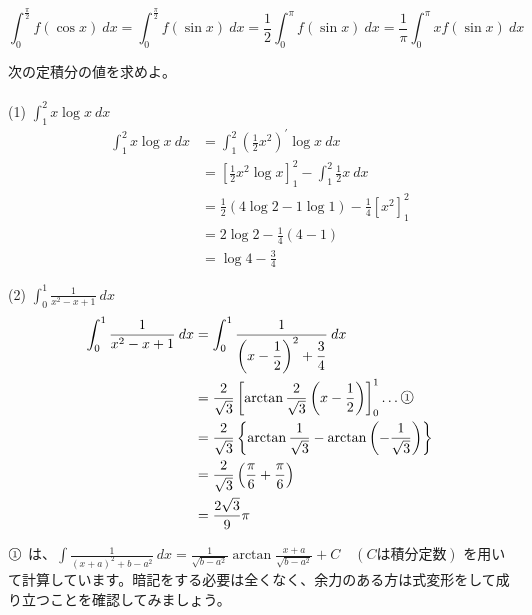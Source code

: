\documentclass[a4j]{jsarticle}
\newcommand{\ctext}[1]{\raise0.2ex\hbox{\textcircled{\scriptsize{#1}}}} %
\begin{document}
    \begin{equation*}
        \int_{0}^{\frac{\pi}{2}} f(\cos x) \: dx = \int_{0}^{\frac{\pi}{2}} f(\sin x) \: dx = \frac{1}{2} \int_{0}^{\pi}f(\sin x) \: dx = \frac{1}{\pi} \int_{0}^{\pi}xf(\sin x) \: dx
    \end{equation*}

    次の定積分の値を求めよ。\\ \\

    (1) $\displaystyle \int_{1}^{2} x \log x  \: dx$ \\

    \begin{align*}
        \int_{1}^{2} x \log x  \: dx &= \int_{1}^{2} \left(\frac{1}{2}x^2\right)^{\prime} \log x  \: dx \\
        &= \left[\frac{1}{2}x^2 \log x\right]_{1}^{2} - \int_{1}^{2} \frac{1}{2} x \: dx \\
        &= \frac{1}{2} (4 \log 2 - 1 \log 1) - \frac{1}{4} \left[x^2\right]_{1}^{2} \\
        &= 2 \log 2 - \frac{1}{4} (4 - 1) \\
        &= \log 4 - \frac{3}{4}
    \end{align*}

    (2) $\displaystyle \int_{0}^{1} \frac{1}{x^2 - x + 1}  \: dx$ \\

    \begin{align*}
        \int_{0}^{1} \frac{1}{x^2 - x + 1}  \: dx &= \int_{0}^{1} \frac{1}{\left(x - \dfrac{1}{2}\right)^2 + \dfrac{3}{4}}  \: dx \\
        &= \frac{2}{\sqrt{3}} \left[\arctan \frac{2}{\sqrt{3}}\left(x - \frac{1}{2}\right)\right]_{0}^{1} \dots \ctext{1} \\
        &= \frac{2}{\sqrt{3}} \left\{\arctan \frac{1}{\sqrt{3}} - \arctan\left(-\frac{1}{\sqrt{3}}\right)\right\} \\
        &= \frac{2}{\sqrt{3}} \left(\frac{\pi}{6} + \frac{\pi}{6}\right) \\
        &= \frac{2\sqrt{3}}{9} \pi
    \end{align*}

    \begin{screen}
        $\ctext{1}$ は、$ \displaystyle \int \frac{1}{\left(x + a\right)^2 + b - a^2}  \: dx = \frac{1}{\sqrt{b - a^2}} \arctan \frac{x + a}{\sqrt{b - a^2}} + C \quad (C は積分定数)$
        を用いて計算しています。暗記をする必要は全くなく、余力のある方は式変形をして成り立つことを確認してみましょう。
    \end{screen}
    \\
\end{document}
